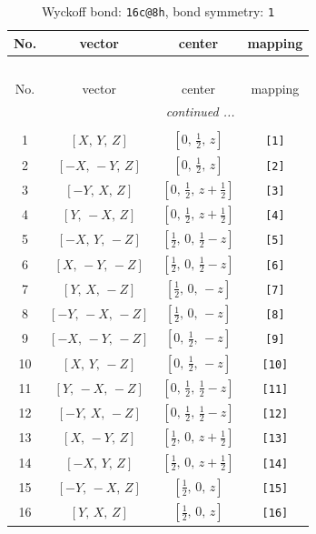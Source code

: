 \documentclass[fleqn,8pt]{jsarticle}
\begin{document}
\begin{longtable}{cccc}
\caption{Wyckoff bond: {\tt 16c@8h}, bond symmetry: {\tt 1}}
 \\
 \hline \hline
No. & vector & center & mapping \\ \hline \endfirsthead

\multicolumn{3}{l}{\tablename\ \thetable{}} \\
 \hline \hline
No. & vector & center & mapping \\ \hline \endhead

 \hline \hline
\multicolumn{3}{r}{\footnotesize\it continued ...} \\ \endfoot

 \hline \hline
\multicolumn{3}{r}{} \\ \endlastfoot

1 & $\left[ X,\, Y,\, Z \right]$ & $\left[ 0,\, \frac{1}{2},\, z \right]$ & {\tt [1]} \\ \hline
2 & $\left[ - X,\, - Y,\, Z \right]$ & $\left[ 0,\, \frac{1}{2},\, z \right]$ & {\tt [2]} \\ \hline
3 & $\left[ - Y,\, X,\, Z \right]$ & $\left[ 0,\, \frac{1}{2},\, z + \frac{1}{2} \right]$ & {\tt [3]} \\ \hline
4 & $\left[ Y,\, - X,\, Z \right]$ & $\left[ 0,\, \frac{1}{2},\, z + \frac{1}{2} \right]$ & {\tt [4]} \\ \hline
5 & $\left[ - X,\, Y,\, - Z \right]$ & $\left[ \frac{1}{2},\, 0,\, \frac{1}{2} - z \right]$ & {\tt [5]} \\ \hline
6 & $\left[ X,\, - Y,\, - Z \right]$ & $\left[ \frac{1}{2},\, 0,\, \frac{1}{2} - z \right]$ & {\tt [6]} \\ \hline
7 & $\left[ Y,\, X,\, - Z \right]$ & $\left[ \frac{1}{2},\, 0,\, - z \right]$ & {\tt [7]} \\ \hline
8 & $\left[ - Y,\, - X,\, - Z \right]$ & $\left[ \frac{1}{2},\, 0,\, - z \right]$ & {\tt [8]} \\ \hline
9 & $\left[ - X,\, - Y,\, - Z \right]$ & $\left[ 0,\, \frac{1}{2},\, - z \right]$ & {\tt [9]} \\ \hline
10 & $\left[ X,\, Y,\, - Z \right]$ & $\left[ 0,\, \frac{1}{2},\, - z \right]$ & {\tt [10]} \\ \hline
11 & $\left[ Y,\, - X,\, - Z \right]$ & $\left[ 0,\, \frac{1}{2},\, \frac{1}{2} - z \right]$ & {\tt [11]} \\ \hline
12 & $\left[ - Y,\, X,\, - Z \right]$ & $\left[ 0,\, \frac{1}{2},\, \frac{1}{2} - z \right]$ & {\tt [12]} \\ \hline
13 & $\left[ X,\, - Y,\, Z \right]$ & $\left[ \frac{1}{2},\, 0,\, z + \frac{1}{2} \right]$ & {\tt [13]} \\ \hline
14 & $\left[ - X,\, Y,\, Z \right]$ & $\left[ \frac{1}{2},\, 0,\, z + \frac{1}{2} \right]$ & {\tt [14]} \\ \hline
15 & $\left[ - Y,\, - X,\, Z \right]$ & $\left[ \frac{1}{2},\, 0,\, z \right]$ & {\tt [15]} \\ \hline
16 & $\left[ Y,\, X,\, Z \right]$ & $\left[ \frac{1}{2},\, 0,\, z \right]$ & {\tt [16]} \\
\end{longtable}
\end{document}
